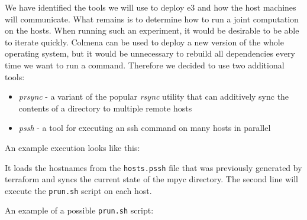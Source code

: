 \documentclass[
]{article}
\newenvironment{Shaded}{}{}
\newcommand{\AttributeTok}[1]{\textcolor[rgb]{0.49,0.56,0.16}{#1}}
\newcommand{\ExtensionTok}[1]{#1}
\newcommand{\NormalTok}[1]{#1}
\newcommand{\StringTok}[1]{\textcolor[rgb]{0.25,0.44,0.63}{#1}}
\newcommand{\VariableTok}[1]{\textcolor[rgb]{0.10,0.09,0.49}{#1}}
\providecommand{\tightlist}{%
  \setlength{\itemsep}{0pt}\setlength{\parskip}{0pt}}
\begin{document}
We have identified the tools we will use to deploy \gls{e3} and how the
host machines will communicate. What remains is to determine how to run
a joint computation on the hosts. When running such an experiment, it
would be desirable to be able to iterate quickly. Colmena can be used to
deploy a new version of the whole operating system, but it would be
unnecessary to rebuild all dependencies every time we want to run a
command. Therefore we decided to use two additional tools:

\begin{itemize}
  \tightlist
  \item
        \emph{prsync} - a variant of the popular \emph{rsync} utility that can
        additively sync the contents of a directory to multiple remote hosts
  \item
        \emph{pssh} - a tool for executing an ssh command on many hosts in
        parallel
\end{itemize}

An example execution looks like this:

\begin{Shaded}
\end{Shaded}

It loads the hostnames from the \texttt{hosts.pssh} file that was
previously generated by terraform and syncs the current state of the
mpyc directory. The second line will execute the \texttt{prun.sh} script
on each host.

An example of a possible \texttt{prun.sh} script:
\end{document}
